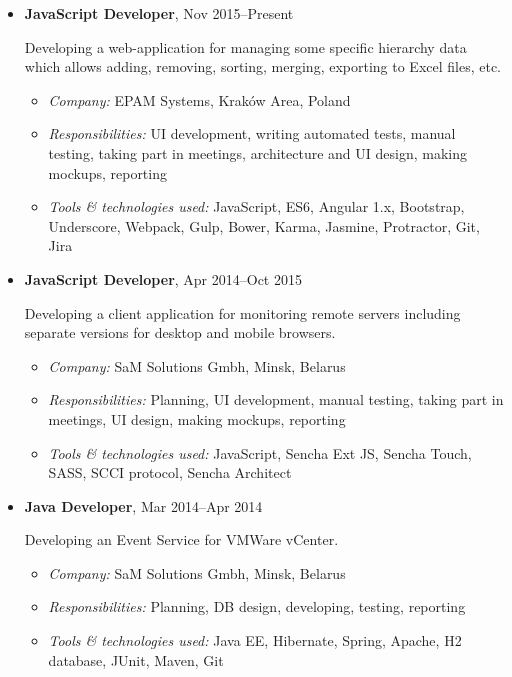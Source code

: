 \documentclass[a4paper, 12pt]{article}
\newcommand{\position}[1]{
    \textbf{#1}}
\newcommand{\itemlabel}[1]{
    \textit{#1:}}
\begin{document}
    \begin{itemize}

        \item \position{JavaScript Developer}, Nov 2015--Present

            Developing a web-application for managing some specific hierarchy data which allows adding, removing, sorting, merging, exporting to Excel files, etc.

            \begin{itemize}
                \item \itemlabel{Company} EPAM Systems, Kraków Area, Poland
                \item \itemlabel{Responsibilities} UI development, writing automated tests, manual testing, taking part in meetings, architecture and UI design, making mockups, reporting
                \item \itemlabel{Tools \& technologies used} JavaScript, ES6, Angular 1.x, Bootstrap, Underscore, Webpack, Gulp, Bower, Karma, Jasmine, Protractor, Git, Jira
            \end{itemize}

        \item \position{JavaScript Developer}, Apr 2014--Oct 2015

            Developing a client application for monitoring remote servers including separate versions for desktop and mobile browsers.

            \begin{itemize}
                \item \itemlabel{Company} SaM Solutions Gmbh, Minsk, Belarus
                \item \itemlabel{Responsibilities} Planning, UI development, manual testing, taking part in meetings, UI design, making mockups, reporting
                \item \itemlabel{Tools \& technologies used} JavaScript, Sencha Ext JS, Sencha Touch, SASS, SCCI protocol, Sencha Architect
            \end{itemize}

        \item \position{Java Developer}, Mar 2014--Apr 2014

            Developing an Event Service for VMWare vCenter.

            \begin{itemize}
                \item \itemlabel{Company} SaM Solutions Gmbh, Minsk, Belarus
                \item \itemlabel{Responsibilities} Planning, DB design, developing, testing, reporting
                \item \itemlabel{Tools \& technologies used} Java EE, Hibernate, Spring, Apache, H2 database, JUnit, Maven, Git
            \end{itemize}


\end{itemize}
\end{document}
